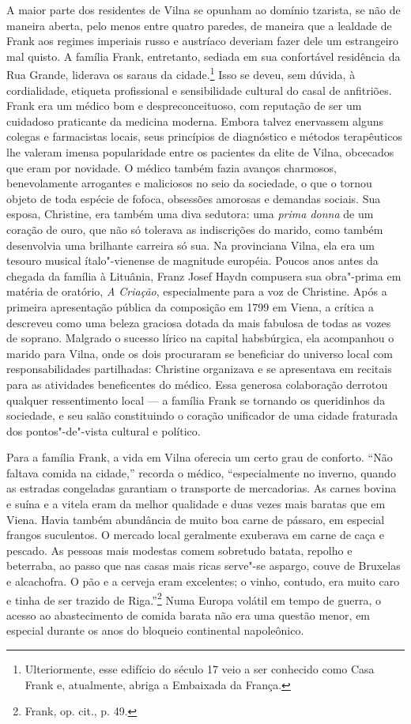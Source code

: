 A maior parte dos residentes de Vilna se opunham ao domínio tzarista, se
não de maneira aberta, pelo menos entre quatro paredes, de maneira que a
lealdade de Frank aos regimes imperiais russo e austríaco deveriam fazer
dele um estrangeiro mal quisto. A família Frank, entretanto, sediada em
sua confortável residência da Rua Grande, liderava os saraus da
cidade.\footnote{Ulteriormente, esse edifício do século 17 veio a ser
  conhecido como Casa Frank e, atualmente, abriga a Embaixada da França.}
Isso se deveu, sem dúvida, à cordialidade, etiqueta profissional e
sensibilidade cultural do casal de anfitriões. Frank era um médico bom e
despreconceituoso, com reputação de ser um cuidadoso praticante da
medicina moderna. Embora talvez enervassem alguns colegas e farmacistas
locais, seus princípios de diagnóstico e métodos terapêuticos lhe
valeram imensa popularidade entre os pacientes da elite de Vilna,
obcecados que eram por novidade. O médico também fazia avanços
charmosos, benevolamente arrogantes e maliciosos no seio da sociedade, o
que o tornou objeto de toda espécie de fofoca, obsessões amorosas e
demandas sociais. Sua esposa, Christine, era também uma diva sedutora:
uma \emph{prima donna} de um coração de ouro, que não só tolerava as
indiscrições do marido, como também desenvolvia uma brilhante carreira
só sua. Na provinciana Vilna, ela era um tesouro musical ítalo"-vienense
de magnitude européia. Poucos anos antes da chegada da família à
Lituânia, Franz Josef Haydn compusera sua obra"-prima em matéria de
oratório, \emph{A Criação}, especialmente para a voz de Christine. Após
a primeira apresentação pública da composição em 1799 em Viena, a
crítica a descreveu como uma beleza graciosa dotada da mais fabulosa de
todas as vozes de soprano. Malgrado o sucesso lírico na capital
habsbúrgica, ela acompanhou o marido para Vilna, onde os dois procuraram
se beneficiar do universo local com responsabilidades partilhadas:
Christine organizava e se apresentava em recitais para as atividades
beneficentes do médico. Essa generosa colaboração derrotou qualquer
ressentimento local --- a família Frank se tornando os queridinhos da
sociedade, e seu salão constituindo o coração unificador de uma cidade
fraturada dos pontos"-de"-vista cultural e político.

Para a família Frank, a vida em Vilna oferecia um certo grau de
conforto. ``Não faltava comida na cidade,'' recorda o médico,
``especialmente no inverno, quando as estradas congeladas garantiam o
transporte de mercadorias. As carnes bovina e suína e a vitela eram da
melhor qualidade e duas vezes mais baratas que em Viena. Havia também
abundância de muito boa carne de pássaro, em especial frangos
suculentos. O mercado local geralmente exuberava em carne de caça e
pescado. As pessoas mais modestas comem sobretudo batata, repolho e
beterraba, ao passo que nas casas mais ricas serve"-se aspargo, couve de
Bruxelas e alcachofra. O pão e a cerveja eram excelentes; o vinho,
contudo, era muito caro e tinha de ser trazido de Riga.''\footnote{Frank,
  op. cit., p. 49.} Numa Europa volátil em tempo de guerra, o acesso ao
abastecimento de comida barata não era uma questão menor, em especial
durante os anos do bloqueio continental napoleônico.

